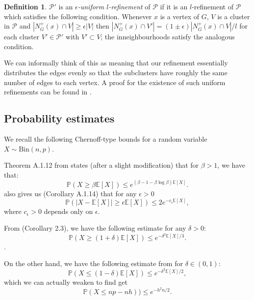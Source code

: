 \documentclass[10pt,letterpaper, reqno]{amsart}
\theoremstyle{definition}
\newtheorem{defn}[thm]{Definition}
\numberwithin{equation}{section}
\begin{document}
\begin{defn}
	$\mathcal{P}'$ is an \textit{$\epsilon$-uniform $l$-refinement} of $\mathcal{P}$ if it is an $l$-refinement of $\mathcal{P}$ which satisfies the following condition. Whenever $x$ is a vertex of $G$, $V$ is a cluster in $\mathcal{P}$ and $|N_G^+(x) \cap V| \geq \epsilon|V|$ then $|N_G^+(x) \cap V'| = (1 \pm \epsilon)|N^+_G(x) \cap V|/l$ for each cluster $V' \in \mathcal{P}'$ with $V' \subset V$; the inneighbourhoods satisfy the analogous condition.
\end{defn}

\noindent We can informally think of this as meaning that our refinement essentially distributes the edges evenly so that the subclusters have roughly the same number of edges to each vertex. A proof for the existence of such uniform refinements can be found in \cite{HamiltonDecomp}. 

\subsection{Probability estimates}
We recall the following Chernoff-type bounds for a random variable $X \sim \text{Bin}(n,p)$.

Theorem A.1.12 from \cite{TheProbabilisticMethod} states (after a slight modification) that for $\beta >1$, we have that:
\begin{equation}\label{Cher2}
	\mathbb{P}(X \geq \beta \mathbb{E}[X]) \leq e^{(\beta-1 - \beta \log \beta)\mathbb{E}[X]}.
\end{equation}
\cite{TheProbabilisticMethod} also gives us (Corollary A.1.14) that for any $\epsilon >0$ 
\begin{equation}\label{Cher4}
	\mathbb{P}(|X-\mathbb{E}[X]| \geq \epsilon \mathbb{E}[X]) \leq 2e^{-c_\epsilon \mathbb{E}[X]},
\end{equation}
where $c_\epsilon >0$ depends only on $\epsilon$.

From \cite{RandomGraphs} (Corollary 2.3), we have the following estimate for any $\delta >0 $:
\begin{equation}\label{Cher1}
\mathbb{P}(X \geq (1+\delta)\mathbb{E}[X])\leq e^{-\delta^2 \mathbb{E}[X]/3}.
\end{equation}.

On the other hand, we have the following estimate from \cite{ProbabilityAndComputing} for $\delta \in (0,1)$:
\begin{equation}\label{Cher5}
\mathbb{P}(X \leq (1-\delta)\mathbb{E}[X])\leq e^{-\delta^2 \mathbb{E}[X]/2}, 
\end{equation}
which we can actually weaken to find get
\begin{equation}\label{Cher3}
\mathbb{P}(X \leq np - nh)) \leq e^{-h^2n/2}.
\end{equation}
\end{document}
